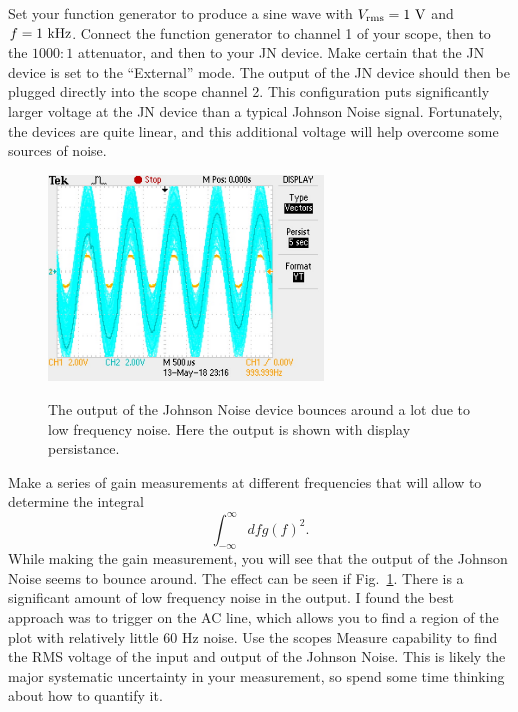 \documentclass[12pt]{article}
\begin{document}
Set your function generator to produce a sine wave with $V_{\rm rms} = 1~\rm V$ and $f = 1~\rm kHz$.  
Connect the function generator to channel 1 of your scope, then to the $1000:1$ attenuator, and then to your JN device.  Make certain that the JN device is set to the ``External'' mode.  The output of the JN device should then be plugged directly into the scope channel 2.  This configuration puts significantly larger voltage at the JN device than a typical Johnson Noise signal.  Fortunately, the devices are quite linear, and this additional voltage will help overcome some sources of noise.

\begin{figure}[htbp]
\begin{center}
{\includegraphics[width=0.65\textwidth]{figs/gaintrouble.jpg}}
\end{center}
\caption{\label{fig:gaintrouble} The output of the Johnson Noise device bounces around a lot due to low frequency noise.  Here the output is shown with display persistance.}
\end{figure}

Make a series of gain measurements at different frequencies that will allow to determine the integral
\begin{displaymath}
\int_{-\infty}^{\infty} df g(f)^2.
\end{displaymath}
While making the gain measurement, you will see that the output of the Johnson Noise seems to bounce around.  The effect can be seen if Fig.~\ref{fig:gaintrouble}.  There is a significant amount of low frequency noise in the output.  I found the best approach was to trigger on the AC line, which allows you to find a region of the plot with relatively little 60 Hz noise.  Use the scopes Measure capability to find the RMS voltage of the input and output of the Johnson Noise.  This is likely the major systematic uncertainty in your measurement, so spend some time thinking about how to quantify it. 
\end{document}

